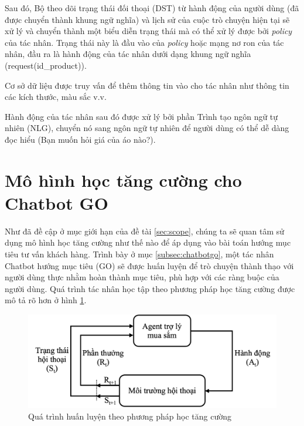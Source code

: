 Sau đó, Bộ theo dõi trạng thái đối thoại (DST) từ hành động của người dùng (đã được chuyển thành khung ngữ nghĩa) và lịch sử của cuộc trò chuyện hiện tại sẽ xử lý và chuyển thành một biểu diễn trạng thái mà có thể xử lý được bởi \textit{policy} của tác nhân. Trạng thái này là đầu vào của \textit{policy} hoặc mạng nơ ron của tác nhân, đầu ra là hành động của tác nhân dưới dạng khung ngữ nghĩa (request(id\_product)).

Cơ sở dữ liệu được truy vấn để thêm thông tin vào cho tác nhân như thông tin các kích thước, màu sắc v.v.

Hành động của tác nhân sau đó được xử lý bởi phần Trình tạo ngôn ngữ tự nhiên (NLG), chuyển nó sang ngôn ngữ tự nhiên để người dùng có thể dễ dàng đọc hiểu (Bạn muốn hỏi giá của áo nào?).

\section{Mô hình học tăng cường cho Chatbot GO}
\label{sec:model}
Như đã đề cập ở mục giới hạn của đề tài \ref{sec:scope}, chúng ta sẽ quan tâm sử dụng mô hình học tăng cường như thế nào để áp dụng vào bài toán hướng mục tiêu tư vấn khách hàng. Trình bày ở mục \ref{subsec:chatbotgo}, một tác nhân Chatbot hướng mục tiêu (GO) sẽ được huấn luyện để trò chuyện thành thạo với người dùng thực nhằm hoàn thành mục tiêu, phù hợp với các ràng buộc của người dùng. Quá trình tác nhân học tập theo phương pháp học tăng cường được mô tả rõ hơn ở hình \ref{fig:learningflow}.

\begin{center}
    \begin{figure}[h!]
        \begin{center}
         \includegraphics[scale=1]{chapter3/img/learningflow.png}
        \end{center}
        \caption{Quá trình huấn luyện theo phương pháp học tăng cường}
        \label{fig:learningflow}
    \end{figure}
\end{center}

